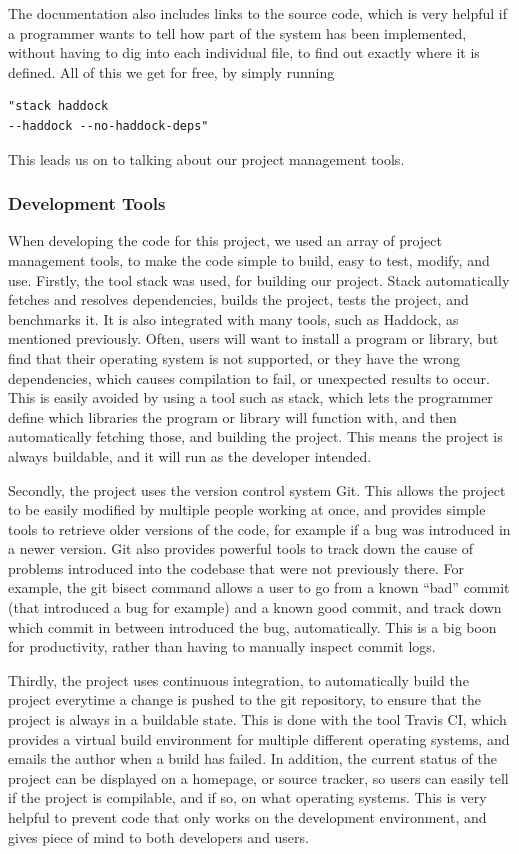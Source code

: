 The documentation also includes links to the source code, which is very helpful
if a programmer wants to tell how part of the system has been implemented,
without having to dig into each individual file, to find out exactly where
it is defined. All of this we get for free, by simply running
\begin{verbatim}
"stack haddock
--haddock --no-haddock-deps"
\end{verbatim}

This leads us on to talking about our project management tools.

\subsubsection{Development Tools}

When developing the code for this project, we used an array of project
management tools, to make the code simple to build, easy to test, modify,
and use. Firstly, the tool stack was used, for building our project.\parencite{code:stack2015}
Stack
automatically fetches and resolves dependencies, builds the project, tests
the project, and benchmarks it. It is also integrated with many tools, such
as Haddock, as mentioned previously. Often, users will want to install a
program or library, but find that their operating system is not supported,
or they have the wrong dependencies, which causes compilation to fail, or
unexpected results to occur. This is easily avoided by using a tool such as
stack, which lets the programmer define which libraries the program or library
will function with, and then automatically fetching those, and building the
project. This means the project is always buildable, and it will run as the
developer intended.

Secondly, the project uses the version control system Git.\parencite{code:torvalds2005}
This allows the project to be easily modified by multiple people working at
once, and provides simple tools to retrieve older versions of the code, for
example if a bug was introduced in a newer version. Git also provides powerful
tools to track down the cause of problems introduced into the codebase that
were not previously there. For example, the git bisect command allows a user
to go from a known ``bad'' commit (that introduced a bug for example) and a 
known good commit, and track down which commit in between introduced the bug,
automatically. This is a big boon for productivity, rather than having to manually
inspect commit logs.

Thirdly, the project uses continuous integration, to automatically build the
project everytime a change is pushed to the git repository, to ensure that
the project is always in a buildable state. This is done with the tool Travis
CI, \parencite{code:travis2011}
which provides a virtual build environment for multiple different operating
systems, and emails the author when a build has failed. In addition, the
current status of the project can be displayed on a homepage, or source tracker,
so users can easily tell if the project is compilable, and if so, on what
operating systems. This is very helpful to prevent code that only works on the
development environment, and gives piece of mind to both developers and users.

